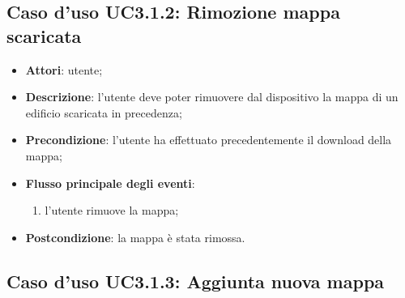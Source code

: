 \documentclass[../AnalisiDeiRequisiti.tex]{subfiles}
\begin{document}
\subsection{Caso d'uso UC3.1.2: Rimozione mappa scaricata}

\begin{itemize}
\item \textbf{Attori}: utente;
\item \textbf{Descrizione}: l'utente deve poter rimuovere dal dispositivo la mappa di un edificio scaricata in precedenza; 
      \item \textbf{Precondizione}: l'utente ha effettuato precedentemente il download della mappa;

        \item \textbf{Flusso principale degli eventi}:
          \begin{enumerate}
          \item l'utente rimuove la mappa;

      \end{enumerate}
    \item \textbf{Postcondizione}: la mappa è stata rimossa.
  \end{itemize}
\hypertarget{UC3.1.3}{}
\subsection{Caso d'uso UC3.1.3: Aggiunta nuova mappa}
\end{document}
